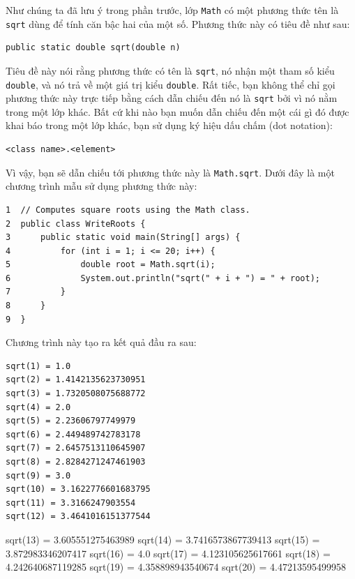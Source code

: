 Như chúng ta đã lưu ý trong phần trước, lớp \texttt{Math} có một phương
thức tên là \texttt{sqrt} dùng để tính căn bậc hai của một số. Phương
thức này có tiêu đề như sau:

\begin{verbatim}
public static double sqrt(double n)
\end{verbatim}

Tiêu đề này nói rằng phương thức có tên là \texttt{sqrt}, nó nhận một
tham số kiểu \texttt{double}, và nó trả về một giá trị kiểu
\texttt{double}. Rất tiếc, bạn không thể chỉ gọi phương thức này trực
tiếp bằng cách dẫn chiếu đến nó là \texttt{sqrt} bởi vì nó nằm trong một
lớp khác. Bất cứ khi nào bạn muốn dẫn chiếu đến một cái gì đó được khai
báo trong một lớp khác, bạn sử dụng ký hiệu dấu chấm (dot notation):

\begin{verbatim}
<class name>.<element>
\end{verbatim}

Vì vậy, bạn sẽ dẫn chiếu tới phương thức này là \texttt{Math.sqrt}. Dưới
đây là một chương trình mẫu sử dụng phương thức này:

\begin{verbatim}
1  // Computes square roots using the Math class.
2  public class WriteRoots {
3      public static void main(String[] args) {
4          for (int i = 1; i <= 20; i++) {
5              double root = Math.sqrt(i);
6              System.out.println("sqrt(" + i + ") = " + root);
7          }
8      }
9  }
\end{verbatim}

Chương trình này tạo ra kết quả đầu ra sau:

\begin{verbatim}
sqrt(1) = 1.0 
sqrt(2) = 1.4142135623730951 
sqrt(3) = 1.7320508075688772 
sqrt(4) = 2.0 
sqrt(5) = 2.23606797749979 
sqrt(6) = 2.449489742783178 
sqrt(7) = 2.6457513110645907 
sqrt(8) = 2.8284271247461903 
sqrt(9) = 3.0 
sqrt(10) = 3.1622776601683795 
sqrt(11) = 3.3166247903554 
sqrt(12) = 3.4641016151377544 
\end{verbatim}

sqrt(13) = 3.605551275463989 sqrt(14) = 3.7416573867739413 sqrt(15) =
3.872983346207417 sqrt(16) = 4.0 sqrt(17) = 4.123105625617661 sqrt(18) =
4.242640687119285 sqrt(19) = 4.358898943540674 sqrt(20) =
4.47213595499958

